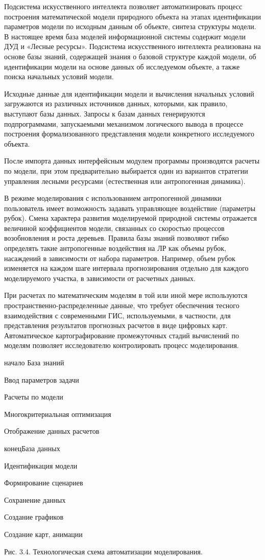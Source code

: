 \documentclass{article}
\begin{document}
Подсистема искусственного интеллекта позволяет 
автоматизировать процесс построения математической 
модели природного объекта на этапах идентификации 
параметров модели по исходным данным об объекте, 
синтеза структуры модели. В настоящее время 
база моделей информационной системы содержит 
модели ДУД и «Лесные ресурсы». Подсистема искусственного 
интеллекта реализована на основе базы знаний, 
содержащей знания о базовой структуре каждой 
модели, об идентификации модели на основе данных 
об исследуемом объекте, а также поиска начальных 
условий модели. 

Исходные данные для идентификации модели и 
вычисления начальных условий загружаются из 
различных источников данных, которыми, как 
правило, выступают базы данных. Запросы к базам 
данных генерируются подпрограммами, запускаемыми 
механизмом логического вывода в процессе построения 
формализованного представления модели конкретного 
исследуемого объекта. 

После импорта данных интерфейсным модулем 
программы производятся расчеты по модели, при 
этом предварительно выбирается один из вариантов 
стратегии управления лесными ресурсами (естественная 
или антропогенная динамика). 

В режиме моделирования с использованием антропогенной 
динамики пользователь имеет возможность задавать 
управляющее воздействие (параметры рубок). 
Смена характера развития моделируемой природной 
системы отражается величиной коэффициентов 
модели, связанных со скоростью процессов возобновления 
и роста деревьев. Правила базы знаний позволяют 
гибко определять такие антропогенные воздействия 
на ЛР как объемы рубок, насаждений в зависимости 
от набора параметров. Например, объем рубок 
изменяется на каждом шаге интервала прогнозирования 
отдельно для каждого моделируемого участка, 
в зависимости от расчетных данных.

При расчетах по математическим моделям в той 
или иной мере используются пространственно-распределенные 
данные, что требует обеспечения тесного взаимодействия 
с современными ГИС, используемыми, в частности, 
для представления результатов прогнозных расчетов 
в виде цифровых карт. Автоматическое картографирование 
промежуточных стадий вычислений по моделям 
позволяет исследователю контролировать процесс 
моделирования.

\begin{center}
начало
База знаний

Ввод параметров задачи

Расчеты по модели

Многокритериальная оптимизация

Отображение данных расчетов

конецБаза данных

Идентификация модели

Формирование сценариев

Сохранение данных

Создание графиков

Создание карт, анимации

Рис. 3.4. Технологическая схема автоматизации 
моделирования.
\end{center}
\end{document}
